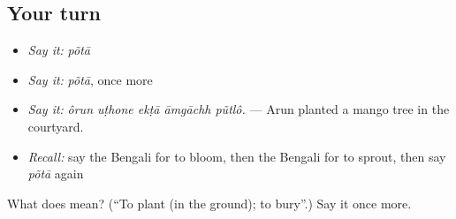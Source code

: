 \subsection*{Your turn}
\begin{itemize}
\raggedright
  \item \emph{Say it:} \emph{põtā}
  \item \emph{Say it:} \emph{põtā}, once more
  \item \emph{Say it:} \emph{ôrun uṭhone ekṭā āmgāchh pũtlô.} — Arun planted a mango tree in the courtyard.
  \item \emph{Recall:} say the Bengali for to bloom, then the Bengali for to sprout, then say \emph{põtā} again
\end{itemize}

\begin{tcolorbox}[breakable,colback=teal!4,colframe=teal!35!black,title={Before you move on}]
What does  mean? (\textquotedblleft{}To plant (in the ground); to bury\textquotedblright{}.) Say it once more.
\end{tcolorbox}
